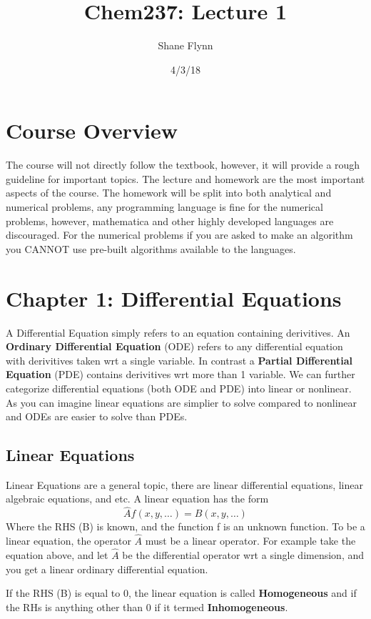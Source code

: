 \documentclass{article}
\title{Chem237: Lecture 1}
\date{4/3/18}
\author{Shane Flynn}
\newcommand{\be}{\begin{equation}}
\newcommand{\ee}{\end{equation}}
\begin{document}
\maketitle
\section*{Course Overview}
The course will not directly follow the textbook, however, it will provide a rough guideline for important topics.
The lecture and homework are the most important aspects of the course.
The homework will be split into both analytical and numerical problems, any programming language is fine for the numerical problems, however, mathematica and other highly developed languages are discouraged.
For the numerical problems if you are asked to make an algorithm you CANNOT use pre-built algorithms available to the languages.

\section*{Chapter 1: Differential Equations}
A Differential Equation simply refers to an equation containing derivitives.
An \textbf{Ordinary Differential Equation} (ODE) refers to any differential equation with derivitives taken wrt a single variable.
In contrast a \textbf{Partial Differential Equation} (PDE) contains derivitives wrt more than 1 variable. 
We can further categorize differential equations (both ODE and PDE) into linear or nonlinear. 
As you can imagine linear equations are simplier to solve compared to nonlinear and ODEs are easier to solve than PDEs. 

\subsection*{Linear Equations}
Linear Equations are a general topic, there are linear differential equations, linear algebraic equations, and etc. 
A linear equation has the form
\be
\hat{A} f(x,y,\hdots) = B(x,y,\hdots)
\ee
Where the RHS (B) is known, and the function f is an unknown function. 
To be a linear equation, the operator $\hat{A}$ must be a linear operator.
For example take the equation above, and let $\hat{A}$ be the differential operator wrt a single dimension, and you get a linear ordinary differential equation. 

If the RHS (B) is equal to 0, the linear equation is called \textbf{Homogeneous} and if the RHs is anything other than 0 if it termed \textbf{Inhomogeneous}.
\end{document}
